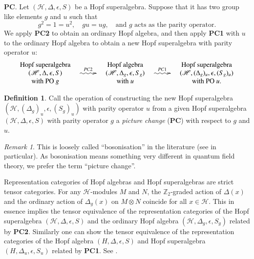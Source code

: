 \documentclass[12pt]{amsart}
\theoremstyle{definition}
\newtheorem{definition}[theorem]{Definition}
\theoremstyle{remark}
\newtheorem{remark}[theorem]{Remark}
\numberwithin{equation}{section}
\begin{document}
{\bf PC}. Let $({{\mathscr H}}, \Delta, \epsilon, S)$ be a Hopf superalgebra. Suppose that it has two group like elements $g$ and $u$  such that
\[
g^2=1=u^2, \quad g u=u g,\quad \text{and $g$ acts as the parity operator}.
\]
We apply {\bf PC2} to obtain an ordinary Hopf algebra, and then apply {\bf PC1} with $u$ to the ordinary Hopf algebra to obtain a new Hopf superalgebra with parity operator $u$:
\begin{eqnarray*}
\begin{array}{c}
\text{Hopf superalgebra}\\
({{\mathscr H}}, \Delta, \epsilon, S)\\
\text{with PO $g$}
\end{array}
\stackrel{PC2}{\xymatrix{{}\ar@{~>}[r]&{}}}
\begin{array}{c}
\text{Hopf algebra}\\
({{\mathscr H}}, \Delta_g, \epsilon, S_g)\\
\text{with $u$}
\end{array}
\stackrel{PC1}{\xymatrix{{}\ar@{~>}[r]&{}}}
\begin{array}{c}
\text{Hopf superalgebra}\\
({{\mathscr H}}, (\Delta_g)_u, \epsilon, (S_g)_u)\\
\text{with PO $u$}.
\end{array}
\end{eqnarray*}

\begin{definition} \label{def:PC} Call the operation of constructing the new Hopf superalgebra $({{\mathscr H}}, (\Delta_g)_u, \epsilon, (S_g)_u)$ with parity operator $u$ from a given Hopf superalgebra
$({{\mathscr H}}, \Delta, \epsilon, S)$ with parity operator $g$  a {\em picture change} ({\bf PC}) with respect to $g$ and $u$.
\end{definition}

\begin{remark}\label{rem:bosonisation}
This is loosely called ``bosonisation'' in the literature (see \cite{Ma} in particular).
As bosonisation means something very different in quantum field theory, we prefer the term ``picture change''.
\end{remark}

Representation categories of Hopf algebras and Hopf superalgebras are strict tensor categories.
For any ${{\mathscr H}}$-modules $M$ and $N$,  the ${{\mathbb Z}}_2$-graded action of $\Delta(x)$ and  the ordinary action of $\Delta_g(x)$ on $M\otimes N$ coincide for all $x\in {{\mathscr H}}$.
This in essence implies the tensor equivalence of the representation categories of the Hopf
superalgebra $({{\mathscr H}}, \Delta, \epsilon, S)$ and the ordinary Hopf algebra $({{\mathscr H}}, \Delta_g, \epsilon, S_g)$ related by {\bf PC2}.  Similarly one can show the
tensor equivalence of the representation categories of the Hopf
algebra $(H, \Delta, \epsilon, S)$ and Hopf superalgebra $(H, \Delta_u, \epsilon, S_u)$
related by {\bf PC1}. See  \cite[Theorem 3.1.1]{AEG}.
\end{document}
